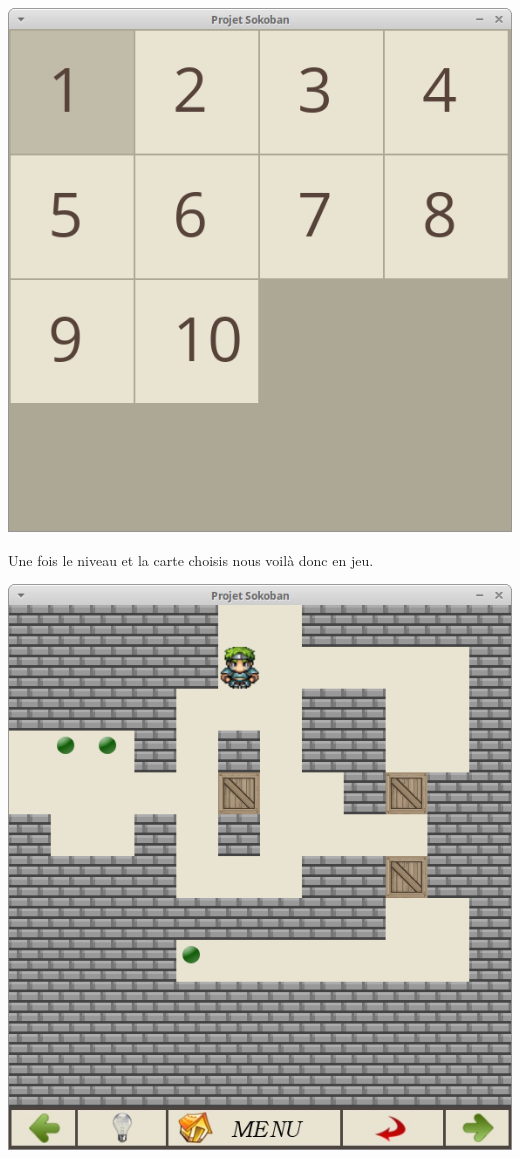 \documentclass[english,11pt]{report}
\begin{document}
\begin{center} 
\includegraphics[scale=0.4]{cartes}
\end{center}
\vspace{0.2cm}
\vspace{0.2cm}
Une fois le niveau et la carte choisis nous voilà donc en jeu.\par
\vspace{0.5cm}
\begin{center}
\includegraphics[scale=0.4]{jeu}
\end{center}
\end{document}
